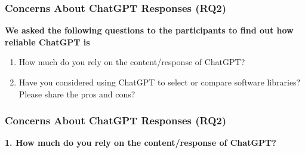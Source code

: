 

\begin{frame}
    \frametitle{Concerns About ChatGPT Responses (RQ2)}
    \textbf{We asked the following questions to the participants to find out how reliable ChatGPT is}
    \vspace{1cm}
    \begin{enumerate}
        \item How much do you rely on the content/response of ChatGPT?
        \item Have you considered using ChatGPT to select or compare software
        libraries? Please share the pros and cons?
    \end{enumerate}

\end{frame}

\begin{frame}
    \frametitle{Concerns About ChatGPT Responses (RQ2)}
    \textbf{1. How much do you rely on the content/response of ChatGPT?}
    \vspace{1cm}
\end{frame}


